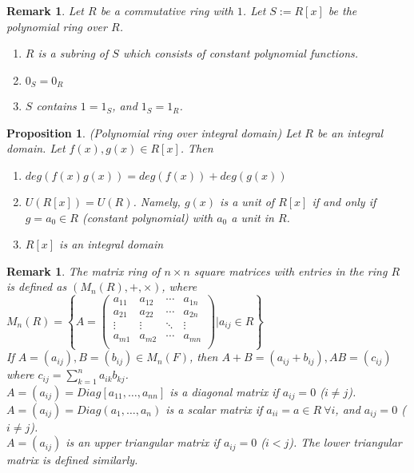 \documentclass[a4paper,8pt]{article}
\theoremstyle{theorem}
\newtheorem{proposition}[theorem]{Proposition}
\newtheorem{remark}[theorem]{Remark}
\begin{document}
\begin{remark}
Let $R$ be a commutative ring with $1$. Let $S:= R[x]$ be the polynomial ring over $R$.
\begin{enumerate}[label=(\roman*)]
\item $R$ is a subring of $S$ which consists of constant polynomial functions.
\item $0_S = 0_R$
\item $S$ contains $1=1_S$, and $1_S = 1_R$.
\end{enumerate}
\end{remark}


\begin{proposition}
\textit{{\color{blue} (Polynomial ring over integral domain)}} Let $R$ be an integral domain. Let $f(x), g(x) \in R[x]$. Then
\begin{enumerate}[label=(\roman*)]
\item $deg(f(x)g(x)) = deg(f(x))+deg(g(x))$
\item $U(R[x]) = U(R)$. Namely, $g(x)$ is a unit of $R[x]$ if and only if $g=a_0 \in R$ (constant polynomial) with $a_0$ a unit in $R$.
\item $R[x]$ is an integral domain
\end{enumerate}
\end{proposition}


\begin{remark}
The {{\color{blue} matrix ring of $n \times n$ square matrices with entries in the ring $R$}} is defined as $(M_n(R), +, \times)$, where\\
$M_n(R) = \left\{A=\begin{pmatrix}
a_{11} & a_{12} & \cdots & a_{1n}\\
a_{21} & a_{22} & \cdots & a_{2n}\\
\vdots & \vdots & \ddots & \vdots\\
a_{m1} & a_{m2} & \cdots & a_{mn}\\
\end{pmatrix} | a_{ij} \in R \right\}$\\
If $A = (a_{ij}), B = (b_{ij}) \in M_n(F)$, then $A+B=(a_{ij} + b_{ij}), AB = (c_{ij})$ where $c_{ij} = \sum_{k=1}^{n} a_{ik} b_{kj}$.\\
$A=(a_{ij}) = Diag[a_{11}, \ldots, a_{nn}]$ is a diagonal matrix if $a_{ij} = 0$ ($i \neq j$).\\
$A=(a_{ij}) = Diag(a_1, \ldots, a_n)$ is a scalar matrix if $a_{ii} = a \in R \ \forall i$, and $a_{ij} = 0$ ($i \neq j$).\\
$A=(a_{ij})$ is an upper triangular matrix if $a_{ij}=0$ ($i < j$). The lower triangular matrix is defined similarly.\\
\end{remark}
\end{document}
